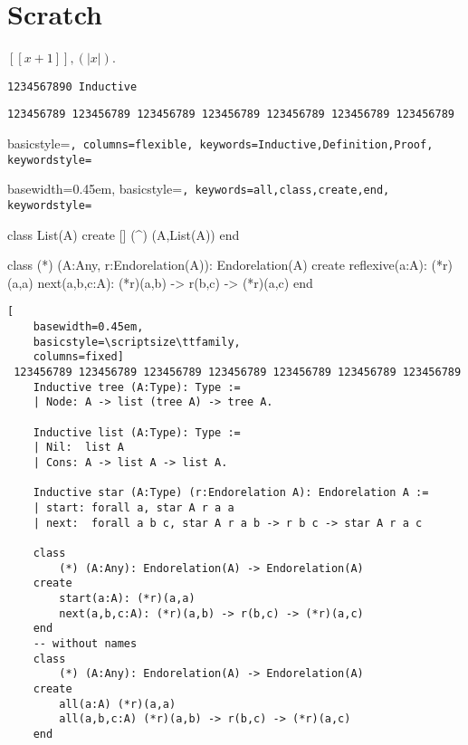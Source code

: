 \documentclass[12pt]{article}
\theoremstyle{definition} \newtheorem{definition}{Definition}[section]
\theoremstyle{definition} \newtheorem{theorem}[definition]{Theorem}
\theoremstyle{definition} \newtheorem{lemma}[definition]{Lemma}
\begin{document}
\section{Scratch}


$[\![x+1]\!], (\!|x|\!)$.

{\scriptsize\texttt{1234567890 Inductive}}

{\scriptsize\tt 123456789 123456789 123456789 123456789 123456789 123456789 123456789}


{ basicstyle=\footnotesize\tt,
  columns=flexible,
  keywords={Inductive,Definition,Proof},
  keywordstyle=\color{blue}
}

{ basewidth=0.45em,
  basicstyle=\scriptsize\tt,
  keywords={all,class,create,end},
  keywordstyle=\color{blue}
}

 {\lstset{language=alba}} {}

\begin{alba}
  class
      List(A)
  create
      []
      (^) (A,List(A))
  end

  class
      (*) (A:Any, r:Endorelation(A)): Endorelation(A)
  create
      reflexive(a:A): (*r)(a,a)
      next(a,b,c:A):  (*r)(a,b) -> r(b,c) -> (*r)(a,c)
  end
\end{alba}

{\footnotesize
  \begin{lstlisting}[
    basewidth=0.45em,
    basicstyle=\scriptsize\ttfamily,
    columns=fixed]
 123456789 123456789 123456789 123456789 123456789 123456789 123456789
    Inductive tree (A:Type): Type :=
    | Node: A -> list (tree A) -> tree A.

    Inductive list (A:Type): Type :=
    | Nil:  list A
    | Cons: A -> list A -> list A.

    Inductive star (A:Type) (r:Endorelation A): Endorelation A :=
    | start: forall a, star A r a a
    | next:  forall a b c, star A r a b -> r b c -> star A r a c

    class
        (*) (A:Any): Endorelation(A) -> Endorelation(A)
    create
        start(a:A): (*r)(a,a)
        next(a,b,c:A): (*r)(a,b) -> r(b,c) -> (*r)(a,c)
    end
    -- without names
    class
        (*) (A:Any): Endorelation(A) -> Endorelation(A)
    create
        all(a:A) (*r)(a,a)
        all(a,b,c:A) (*r)(a,b) -> r(b,c) -> (*r)(a,c)
    end
\end{lstlisting}
}
\end{document}
